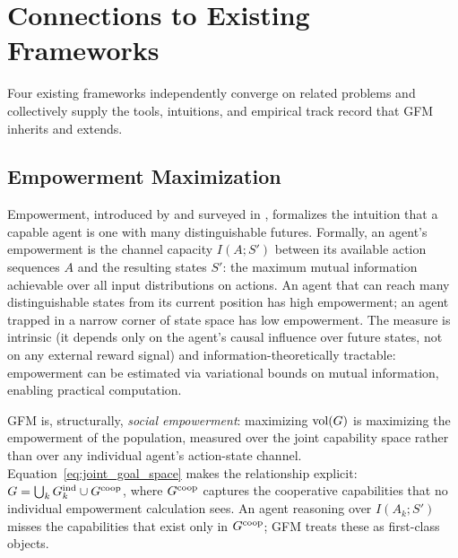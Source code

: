 %
%

\section{Connections to Existing Frameworks}
\label{sec:connections}

Four existing frameworks independently converge on related problems and
collectively supply the tools, intuitions, and empirical track record that GFM
inherits and extends.

\subsection{Empowerment Maximization}
\label{sec:connections_empowerment}

Empowerment, introduced by \citet{klyubin2005empowerment} and surveyed in
\citet{salge2014empowerment}, formalizes the intuition that a capable agent is
one with many distinguishable futures. Formally, an agent's empowerment is the
channel capacity $I(A; S')$ between its available action sequences $A$ and the
resulting states $S'$: the maximum mutual information achievable over all
input distributions on actions. An agent that can reach many distinguishable
states from its current position has high empowerment; an agent trapped in a
narrow corner of state space has low empowerment. The measure is intrinsic (it
depends only on the agent's causal influence over future states, not on any
external reward signal) and information-theoretically tractable: empowerment
can be estimated via variational bounds on mutual information, enabling
practical computation.

GFM is, structurally, \emph{social empowerment}: maximizing $\operatorname{vol}(G)$ is
maximizing the empowerment of the population, measured over the joint
capability space rather than over any individual agent's action-state channel.
Equation~\eqref{eq:joint_goal_space} makes the relationship explicit: $G =
\bigcup_k G_{k}^{\mathrm{ind}} \cup G^{\mathrm{coop}}$, where $G^{\mathrm{coop}}$ captures the cooperative
capabilities that no individual empowerment calculation sees. An agent
reasoning over $I(A_k; S')$ misses the capabilities that exist only in
$G^{\mathrm{coop}}$; GFM treats these as first-class objects.

